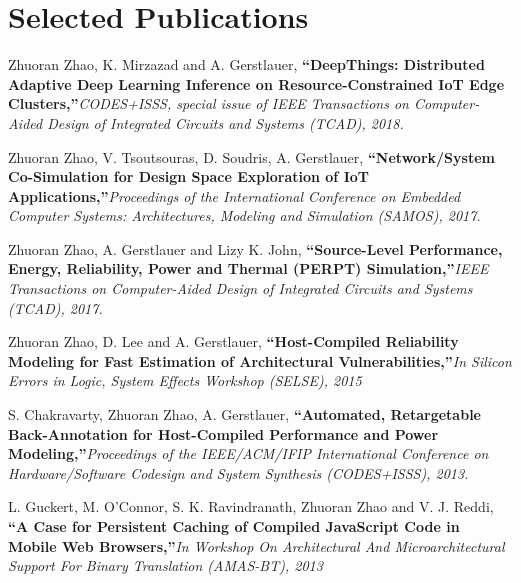 \documentclass[letterpaper,11pt]{article}
\begin{document}
\newcommand{\reference}[2]{\justifying\textbf{``#1,''}{\it #2}\par}



\section{Selected Publications}
\begin{enumerate}[label={[\arabic*]}, leftmargin=*]

  \item \label{DeepThings} {{Zhuoran Zhao}, K. Mirzazad and A. Gerstlauer, \reference{DeepThings: Distributed Adaptive Deep Learning Inference on Resource-Constrained IoT Edge Clusters} 
    {CODES+ISSS, special issue of IEEE Transactions on Computer-Aided Design of Integrated Circuits and Systems (TCAD), 2018.} \vspace{-3pt}}
  \item \label{NoSSim} {{Zhuoran Zhao}, V. Tsoutsouras, D. Soudris, A. Gerstlauer, \reference{Network/System Co-Simulation for Design Space Exploration of IoT Applications} 
    {Proceedings of the International Conference on Embedded Computer Systems: Architectures, Modeling and Simulation (SAMOS), 2017.} \vspace{-3pt}}
  \item \label{PERPT} {{Zhuoran Zhao}, A. Gerstlauer and Lizy K. John, \reference{Source-Level Performance, Energy, Reliability, Power and Thermal (PERPT) Simulation} 
    {IEEE Transactions on Computer-Aided Design of Integrated Circuits and Systems (TCAD), 2017.} \vspace{-3pt}}
  \item \label{Web} {Zhuoran Zhao, D. Lee and A. Gerstlauer, \reference{Host-Compiled Reliability Modeling for Fast Estimation of Architectural Vulnerabilities} 
    {In Silicon Errors in Logic, System Effects Workshop (SELSE), 2015} \vspace{-3pt}}
  \item \label{RBA} {S. Chakravarty, { Zhuoran Zhao}, A. Gerstlauer, \reference{Automated, Retargetable Back-Annotation for Host-Compiled Performance and Power Modeling} 
    {Proceedings of the IEEE/ACM/IFIP International Conference on Hardware/Software Codesign and System Synthesis (CODES+ISSS), 2013.} \vspace{-3pt}}
  \item \label{Web} {L. Guckert, M. O'Connor, S. K. Ravindranath, { Zhuoran Zhao} and V. J. Reddi, \reference{A Case for Persistent Caching of Compiled JavaScript Code in Mobile Web Browsers} 
    {In Workshop On Architectural And Microarchitectural Support For Binary Translation (AMAS-BT), 2013} \vspace{-3pt}}



\end{enumerate}
\end{document}
